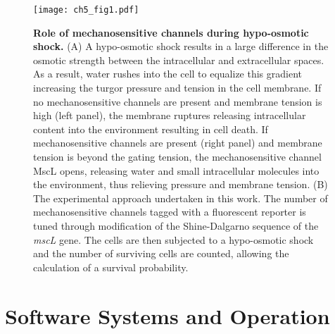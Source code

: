 \documentclass[12pt]{caltech_thesis}
\begin{document}
\hypertarget{fig:overview}{%
\begin{figure}
\centering
\texttt{[image: ch5\_fig1.pdf]}
\caption[{Role of mechanosensitive channels during hypo-osmotic
shock.}]{\textbf{Role of mechanosensitive channels during hypo-osmotic
shock.} (A) A hypo-osmotic shock results in a large difference in the
osmotic strength between the intracellular and extracellular spaces. As
a result, water rushes into the cell to equalize this gradient
increasing the turgor pressure and tension in the cell membrane. If no
mechanosensitive channels are present and membrane tension is high (left
panel), the membrane ruptures releasing intracellular content into the
environment resulting in cell death. If mechanosensitive channels are
present (right panel) and membrane tension is beyond the gating tension,
the mechanosensitive channel MscL opens, releasing water and small
intracellular molecules into the environment, thus relieving pressure
and membrane tension. (B) The experimental approach undertaken in this
work. The number of mechanosensitive channels tagged with a fluorescent
reporter is tuned through modification of the Shine-Dalgarno sequence of
the \emph{mscL} gene. The cells are then subjected to a hypo-osmotic
shock and the number of surviving cells are counted, allowing the
calculation of a survival probability.}
\label{fig:overview}
\end{figure}
}

\hypertarget{software-systems-and-operation}{%
\section{Software Systems and
Operation}\label{software-systems-and-operation}}

\printbibliography
\end{document}
